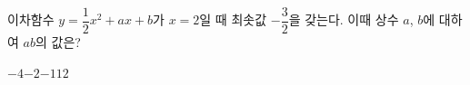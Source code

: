 이차함수 $y=\dfrac{1}{2}x^2+ax+b$가 $x=2$일 때 최솟값 $-\dfrac{3}{2}$을 갖는다. 이때 상수 $a$, $b$에 대하여 $ab$의 값은?
\begin{choices32}{$-4$}{$-2$}{$-1$}{$1$}{$2$}\end{choices32}

